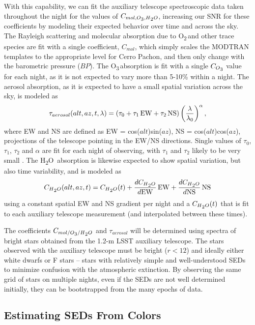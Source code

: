 \documentclass[12pt,preprint]{aastex}
\newcommand{\water}   {H\textsubscript{2}O}
\newcommand{\ozone}    {O\textsubscript{3}}
\newcommand{\oxy}     {O\textsubscript{2}}
\begin{document}
With this capability, we can fit the auxiliary telescope spectroscopic data taken
throughout the night for the values of
$C_{mol,\ozone,\water}$, increasing our SNR for these
coefficients by modeling their expected behavior over time and across
the sky. The Rayleigh
scattering and molecular absorption due to \oxy\,and other trace
species are fit with a single coefficient, $C_{mol}$, which simply
scales the MODTRAN templates to the appropriate level for Cerro
Pachon, and then only change with the barometric pressure ($BP$). The
\ozone\,absorption is fit with a single $C_{\ozone}$ value for each
night, as it is not expected to vary more than 5-10\% within a night. 
The aerosol absorption, as it is expected to have a small
spatial variation across the sky, is modeled as 
\begin{equation}
\label{eqn:tau_aerosol}
\tau_{aerosol}(alt,az,t,\lambda) = (\tau_0 + \tau_1\,{\rm EW} +
\tau_2\,{\rm NS}) \left({\lambda \over \lambda_0}\right)^{\alpha},
\end{equation}
where EW and NS are defined as EW = cos($alt$)sin($az$), NS =
cos($alt$)cos($az$), projections of the telescope pointing in the
EW/NS directions. Single values of $\tau_0$, $\tau_1$, $\tau_2$ and $\alpha$ are
fit for each night of observing, with $\tau_1$ and
$\tau_2$ likely to be very small \citep{Burke2010b}. The \water\,
absorption is likewise expected to show spatial variation, but also
time variability, and is modeled as
\begin{equation}
\label{eqn:coeff_h2o}
C_{\water}(alt,az,t) = C_{\water}(t) + {dC_{\water} \over d{\rm EW}}\,{\rm EW} +
{dC_{\water} \over d{\rm NS}}\,{\rm NS}
\end{equation}
using a constant spatial EW and NS gradient per night and a $C_{\water}(t)$ that 
is fit to each auxiliary telescope measurement (and interpolated
between these times). 

The coefficients $C_{mol/\ozone/\water}$ and $\tau_{aerosol}$ will be
determined using spectra of bright stars obtained from the 1.2-m LSST
auxiliary telescope.  The stars observed with the auxiliary telescope must be
bright ($r<12$) and ideally either white dwarfs or F stars -- stars with relatively
simple and well-understood SEDs to minimize confusion with the
atmospheric extinction. By observing the same grid of stars on
multiple nights, even if the SEDs are not well determined initially,
they can be bootstrapped from the many epochs of data. 

\subsection{Estimating SEDs From Colors}
\end{document}

